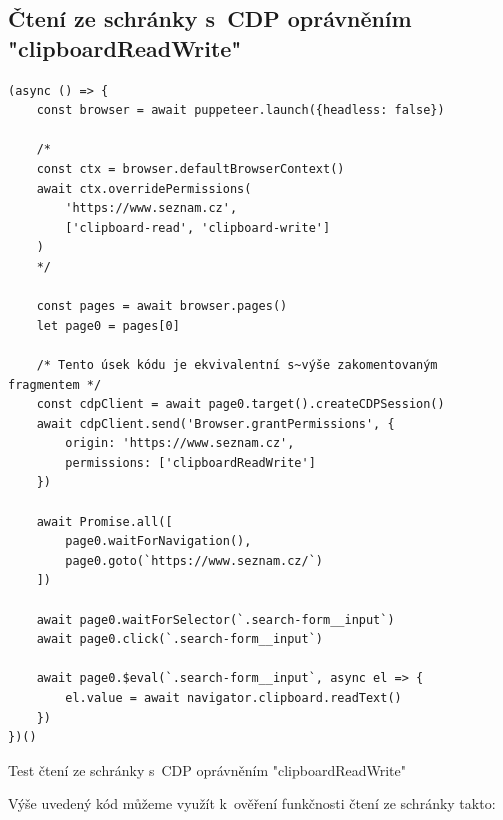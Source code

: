 \documentclass[12pt, a4paper, twoside]{article}
\newcommand{\codefigureSpacing}{1.2}
\begin{document}
	\subsection{Čtení ze schránky s~CDP oprávněním "clipboardReadWrite"}
	\label{sub_sec:readClipboardTest}
		\begin{codefigure}[H]
		\renewcommand\baselinestretch{\codefigureSpacing}
	\begin{lstlisting}[style=MyJavaScript]
(async () => {
	const browser = await puppeteer.launch({headless: false})
	
	/*
	const ctx = browser.defaultBrowserContext()
	await ctx.overridePermissions(
		'https://www.seznam.cz',
		['clipboard-read', 'clipboard-write']
	)
	*/
	
	const pages = await browser.pages()
	let page0 = pages[0]
	
	/* Tento úsek kódu je ekvivalentní s~výše zakomentovaným fragmentem */
	const cdpClient = await page0.target().createCDPSession()
	await cdpClient.send('Browser.grantPermissions', {
		origin: 'https://www.seznam.cz',
		permissions: ['clipboardReadWrite']
	})
	
	await Promise.all([
		page0.waitForNavigation(),
		page0.goto(`https://www.seznam.cz/`)
	])
	
	await page0.waitForSelector(`.search-form__input`)
	await page0.click(`.search-form__input`)
	
	await page0.$eval(`.search-form__input`, async el => {
		el.value = await navigator.clipboard.readText()
	})
})()
	\end{lstlisting}
	\caption{Test čtení ze schránky s~CDP oprávněním "clipboardReadWrite"}
	\label{codefig:readClipboardCheck}
	\end{codefigure}
 	\noindent Výše uvedený kód můžeme využít k~ověření funkčnosti čtení ze schránky takto:
\end{document}

